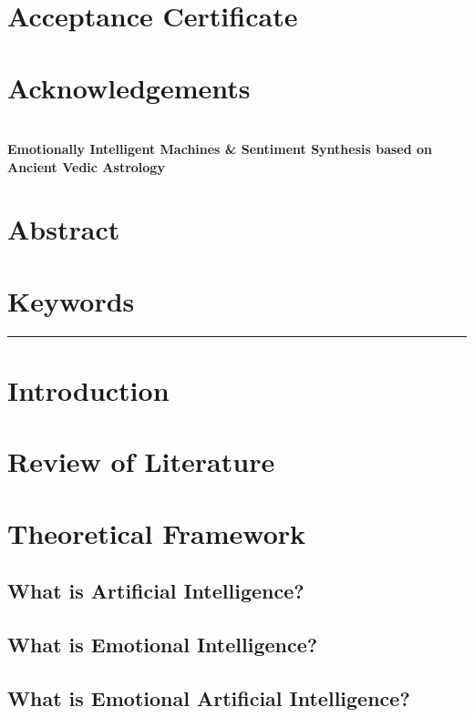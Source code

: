 \documentclass[12pt, a4paper, twoside]{article}
\date{}
\newcommand{\Title}[1]{{\LARGE \centering \hrulefill\\ \textbf{#1}\\ \hrulefill}}
\begin{document}
	\pagestyle{empty}
	
	\section*{\centering \LARGE Acceptance Certificate}
	\vspace{1\baselineskip}
	
	\section*{\centering \LARGE Acknowledgements}
	\vspace{1\baselineskip}
	
	\tableofcontents
	\newpage
	\pagestyle{plain}
	\Title{Emotionally Intelligent Machines \& Sentiment Synthesis based on Ancient Vedic Astrology}
	\section*{Abstract}
	
	\section*{Keywords}
	
	\newline
	\hrule
	\section{Introduction}
	
	\section{Review of Literature}
	
	\section{Theoretical Framework}
	\subsection{What is Artificial Intelligence?}
	
	\subsection{What is Emotional Intelligence?}
	
	\subsection{What is Emotional Artificial Intelligence?}
	
\end{document}
